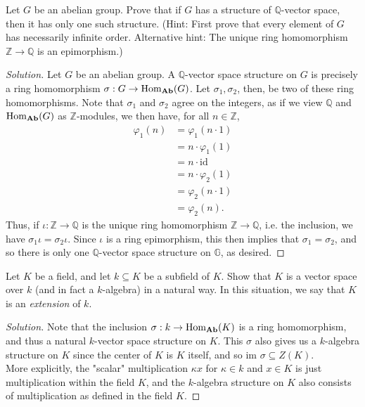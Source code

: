 \documentclass[12pt]{article}
\newenvironment{problem}[2][Problem]{\begin{trivlist}
\item[\hskip \labelsep {\bfseries #1}\hskip \labelsep {\bfseries #2.}]}{\end{trivlist}}
\newcommand{\catname}[1]{\normalfont\textbf{#1}}
\newcommand{\Hom}{\text{Hom}}
\newcommand{\Homc}[2]{\Hom_{\catname{#1}}(#2)}
\newcommand{\id}{\text{id}}
\newcommand{\im}{\text{im }}
\newenvironment{solution}
  {\renewcommand\qedsymbol{$\blacksquare$}\begin{proof}[Solution]}
{\end{proof}}
\theoremstyle{remark}
\begin{document}
\begin{problem}{5.6}
  Let $G$ be an abelian group.
  Prove that if $G$ has a structure of $\mathbb{Q}$-vector space, then it has only one such structure.
  (Hint: First prove that every element of $G$ has necessarily infinite order.
  Alternative hint: The unique ring homomorphism $\mathbb{Z}\to\mathbb{Q}$ is an epimorphism.)
\end{problem}
\begin{solution}
  Let $G$ be an abelian group.
  A $\mathbb{Q}$-vector space structure on $G$ is precisely a ring homomorphism
  $\sigma:G\to\Homc{Ab}{G}$.
  Let $\sigma_1,\sigma_2$, then, be two of these ring homomorphisms.
  Note that $\sigma_1$ and $\sigma_2$ agree on the integers, as if we view $\mathbb{Q}$ and
  $\Homc{Ab}{G}$ as $\mathbb{Z}$-modules, we then have, for all $n\in\mathbb{Z}$,
  \begin{align*}
    \varphi_1(n) &= \varphi_1(n\cdot1) \\
    &= n\cdot\varphi_1(1)\\
    &= n\cdot\id\\
    &= n\cdot\varphi_2(1)\\
    &= \varphi_2(n\cdot1) \\
    &= \varphi_2(n).
  \end{align*}
  Thus, if $\iota:\mathbb{Z}\to\mathbb{Q}$ is the unique ring homomorphism $\mathbb{Z}\to\mathbb{Q}$,
  i.e. the inclusion, we have $\sigma_1\iota = \sigma_2\iota$.
  Since $\iota$ is a ring epimorphism, this then implies that $\sigma_1=\sigma_2$, and so
  there is only one $\mathbb{Q}$-vector space structure on $\mathbb{G}$, as desired.
\end{solution}

\newpage

\begin{problem}{5.7}
  Let $K$ be a field, and let $k\subseteq K$ be a subfield of $K$.
  Show that $K$ is a vector space over $k$ (and in fact a $k$-algebra) in a natural way.
  In this situation, we say that $K$ is an \textit{extension} of $k$.
\end{problem}
\begin{solution}
  Note that the inclusion $\sigma:k\to\Homc{Ab}{K}$ is a ring homomorphism, and thus a natural
  $k$-vector space structure on $K$.
  This $\sigma$ also gives us a $k$-algebra structure on $K$ since the center of $K$ is $K$
  itself, and so $\im\sigma\subseteq Z(K)$.\\
  \indent More explicitly, the "scalar" multiplication $\kappa x$ for $\kappa\in k$ and $x\in K$
  is just multiplication within the field $K$, and the $k$-algebra structure on $K$
  also consists of multiplication as defined in the field $K$.
\end{solution}
\end{document}
